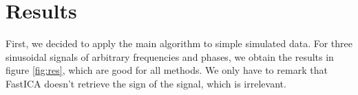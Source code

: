 \documentclass[a4paper]{article}
\begin{document}

\section{Results}
First, we decided to apply the main algorithm to simple simulated data.
For three sinusoidal signals of arbitrary frequencies and phases, we obtain the results in figure \ref{fig:res}, which are good for all methods. We only have to remark that FastICA doesn't retrieve the sign of the signal, which is irrelevant.

\end{document}
